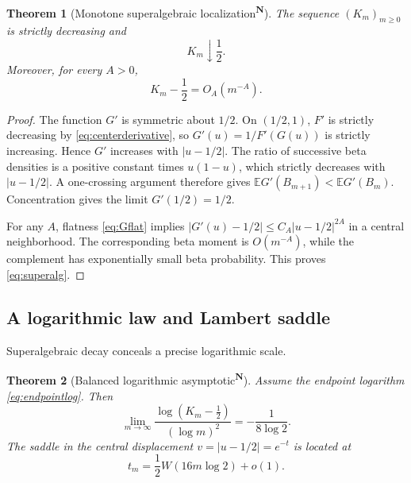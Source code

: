\documentclass[11pt,oneside]{article}
\newtheorem{theorem}{Theorem}[section]
\theoremstyle{definition}
\theoremstyle{remark}
\newcommand{\F}{F}
\newcommand{\G}{G}
\newcommand{\E}{\mathbb E}
\newcommand{\tagnew}{\textsuperscript{\textcolor{oliveink}{\bfseries N}}}
\begin{document}
\begin{theorem}[Monotone superalgebraic localization\tagnew]\label{thm:Km}
The sequence \((K_m)_{m\ge0}\) is strictly decreasing and
\begin{equation}
 K_m\downarrow\frac12.
\end{equation}
Moreover, for every \(A>0\),
\begin{equation}\label{eq:superalg}
 K_m-\frac12=O_A(m^{-A}).
\end{equation}
\end{theorem}

\begin{proof}
The function \(\G'\) is symmetric about \(1/2\).  On \((1/2,1)\),
\(\F'\) is strictly decreasing by \eqref{eq:centerderivative}, so
\(\G'(u)=1/\F'(\G(u))\) is strictly increasing.  Hence \(\G'\) increases with
\(|u-1/2|\).  The ratio of successive beta densities is a positive constant
times \(u(1-u)\), which strictly decreases with \(|u-1/2|\).  A one-crossing
argument therefore gives \(\E\G'(B_{m+1})<\E\G'(B_m)\).  Concentration gives the
limit \(\G'(1/2)=1/2\).

For any \(A\), flatness \eqref{eq:Gflat} implies
\(|\G'(u)-1/2|\le C_A|u-1/2|^{2A}\) in a central neighborhood.  The corresponding
beta moment is \(O(m^{-A})\), while the complement has exponentially small beta
probability.  This proves \eqref{eq:superalg}.
\end{proof}

\subsection{A logarithmic law and Lambert saddle}

Superalgebraic decay conceals a precise logarithmic scale.

\begin{theorem}[Balanced logarithmic asymptotic\tagnew]\label{thm:Klog}
Assume the endpoint logarithm \eqref{eq:endpointlog}.  Then
\begin{equation}\label{eq:Klog}
 \boxed{
 \lim_{m\to\infty}
 \frac{\log(K_m-\tfrac12)}{(\log m)^2}
 =-\frac1{8\log2}.}
\end{equation}
The saddle in the central displacement \(v=|u-1/2|=e^{-t}\) is located at
\begin{equation}\label{eq:LambertSaddle}
 t_m=\frac12W(16m\log2)+o(1).
\end{equation}
\end{theorem}
\end{document}
